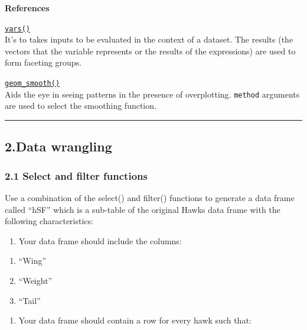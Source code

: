 \documentclass[
]{article}
\providecommand{\tightlist}{%
  \setlength{\itemsep}{0pt}\setlength{\parskip}{0pt}}
\begin{document}
\textbf{References}

\href{https://ggplot2.tidyverse.org/reference/vars.html}{\texttt{vars()}}~\\
It's to takes inputs to be evaluated in the context of a dataset. The
results (the vectors that the variable represents or the results of the
expressions) are used to form faceting groups.

\href{https://ggplot2.tidyverse.org/reference/geom_smooth.html?q=geom\%20_\%20smooth\#arguments}{\texttt{geom\_smooth()}}~\\
Aids the eye in seeing patterns in the presence of overplotting.
\texttt{method} arguments are used to select the smoothing function.

\begin{center}\rule{0.5\linewidth}{0.5pt}\end{center}

\hypertarget{data-wrangling}{%
\subsection{2.Data wrangling}\label{data-wrangling}}

\hypertarget{select-and-filter-functions}{%
\subsubsection{2.1 Select and filter
functions}\label{select-and-filter-functions}}

Use a combination of the select() and filter() functions to generate a
data frame called ``hSF'' which is a sub-table of the original Hawks
data frame with the following characteristics:

\begin{enumerate}
\def\labelenumi{\arabic{enumi}.}
\tightlist
\item
  Your data frame should include the columns:\\
\end{enumerate}

\begin{enumerate}
\def\labelenumi{\alph{enumi})}
\tightlist
\item
  ``Wing''\\
\item
  ``Weight''\\
\item
  ``Tail''
\end{enumerate}

\begin{enumerate}
\def\labelenumi{\arabic{enumi}.}
\setcounter{enumi}{1}
\tightlist
\item
  Your data frame should contain a row for every hawk such that:\\
\end{enumerate}
\end{document}
